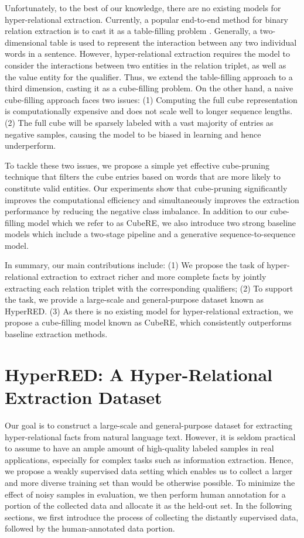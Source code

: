 \documentclass[11pt]{article}
\newcommand{\modelname}{CubeRE}
\newcommand{\dataname}{HyperRED}
\begin{document}
Unfortunately, to the best of our knowledge, there are no existing models for hyper-relational extraction.
Currently, a popular end-to-end method for binary relation extraction is to cast it as a table-filling problem \citep{miwa-sasaki-2014-modeling}.
Generally, a two-dimensional table is used to represent the interaction between any two individual words in a sentence.
However, hyper-relational extraction requires the model to consider the interactions between two entities in the relation triplet, as well as the value entity for the qualifier.
Thus, we extend the table-filling approach to a third dimension, casting it as a cube-filling problem. 
On the other hand, a naive cube-filling approach faces two issues: 
(1) Computing the full cube representation is computationally expensive and does not scale well to longer sequence lengths.
(2) The full cube will be sparsely labeled with a vast majority of entries as negative samples, causing the model to be biased in learning \citep{li-etal-2020-dice} and hence underperform.

To tackle these two issues, we propose a simple yet effective cube-pruning technique that filters the cube entries based on words that are more likely to constitute valid entities.
Our experiments show that cube-pruning significantly improves the computational efficiency and simultaneously improves the extraction performance by reducing the negative class imbalance.
In addition to our cube-filling model which we refer to as \modelname, we also introduce two strong baseline models which include a two-stage pipeline and a generative sequence-to-sequence \citep{NIPS2014_a14ac55a} model. 

In summary, our main contributions include: (1) We propose the task of hyper-relational extraction to extract richer and more complete facts by jointly extracting each relation triplet with the corresponding qualifiers; (2) To support the task, we provide a large-scale and general-purpose dataset known as \dataname.
(3) As there is no existing model for hyper-relational extraction, we propose a cube-filling model known as \modelname, which consistently outperforms baseline extraction methods.


\section{HyperRED: A Hyper-Relational Extraction Dataset}
Our goal is to construct a large-scale and general-purpose dataset for extracting hyper-relational facts from natural language text.
However, it is seldom practical to assume to have an ample amount of high-quality labeled samples in real applications, especially for complex tasks such as information extraction.
Hence, we propose a weakly supervised \citep{10.5555/645634.663209} data setting which enables us to collect a larger and more diverse training set than would be otherwise possible.
To minimize the effect of noisy samples in evaluation, we then perform human annotation for a portion of the collected data and allocate it as the held-out set.
In the following sections, we first introduce the process of collecting the distantly supervised data, followed by the human-annotated data portion. 
\end{document}
